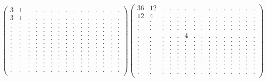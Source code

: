 \documentclass[12pt,a4paper]{amsart}
\begin{document}
\begin{align*}
\left(\begin{array}{rrrrrrrrrrrrrrr}%
3&1&.&.&.&.&.&.&.&.&.&.&.&.&.\\%
3&1&.&.&.&.&.&.&.&.&.&.&.&.&.\\%
.&.&.&.&.&.&.&.&.&.&.&.&.&.&.\\%
.&.&.&.&.&.&.&.&.&.&.&.&.&.&.\\%
.&.&.&.&.&.&.&.&.&.&.&.&.&.&.\\%
.&.&.&.&.&.&.&.&.&.&.&.&.&.&.\\%
.&.&.&.&.&.&.&.&.&.&.&.&.&.&.\\%
.&.&.&.&.&.&.&.&.&.&.&.&.&.&.\\%
.&.&.&.&.&.&.&.&.&.&.&.&.&.&.\\%
.&.&.&.&.&.&.&.&.&.&.&.&.&.&.\\%
.&.&.&.&.&.&.&.&.&.&.&.&.&.&.\\%
.&.&.&.&.&.&.&.&.&.&.&.&.&.&.\\%
.&.&.&.&.&.&.&.&.&.&.&.&.&.&.\\%
.&.&.&.&.&.&.&.&.&.&.&.&.&.&.\\%
.&.&.&.&.&.&.&.&.&.&.&.&.&.&.\\%
\end{array}\right)%
\left(\begin{array}{rrrrrrrrrrrrrrr}%
36&12&.&.&.&.&.&.&.&.&.&.&.&.&.\\%
12&4&.&.&.&.&.&.&.&.&.&.&.&.&.\\%
.&.&.&.&.&.&.&.&.&.&.&.&.&.&.\\%
.&.&.&.&.&.&.&.&.&.&.&.&.&.&.\\%
.&.&.&.&.&.&.&.&.&.&.&.&.&.&.\\%
.&.&.&.&.&4&.&.&.&.&.&.&.&.&.\\%
.&.&.&.&.&.&.&.&.&.&.&.&.&.&.\\%
.&.&.&.&.&.&.&.&.&.&.&.&.&.&.\\%
.&.&.&.&.&.&.&.&.&.&.&.&.&.&.\\%
.&.&.&.&.&.&.&.&.&.&.&.&.&.&.\\%
.&.&.&.&.&.&.&.&.&.&.&.&.&.&.\\%
.&.&.&.&.&.&.&.&.&.&.&.&.&.&.\\%
.&.&.&.&.&.&.&.&.&.&.&.&.&.&.\\%
.&.&.&.&.&.&.&.&.&.&.&.&.&.&.\\%
.&.&.&.&.&.&.&.&.&.&.&.&.&.&.\\%
\end{array}\right)%
\end{align*}
\end{document}

